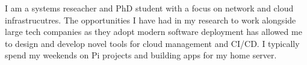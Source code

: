 \documentclass[9pt]{developercv} %
\begin{document}
\begin{minipage}[t]{0.35\textwidth} %
	\vspace{-\baselineskip} %

	I am a systems reseacher and PhD student with a focus on network and cloud
	infrastrucutres. The opportunities I have had in my research to work alongside large tech
	companies as they adopt modern software deployment has allowed me to design
	and develop novel tools for cloud management and CI/CD. I typically spend my
	weekends on Pi projects and building apps for my home server.\\
\end{minipage}
\hfill %
\begin{minipage}[t]{0.31\textwidth} %
	\vspace{-\baselineskip} %
	\begin{barchart}{4.1}
	\end{barchart}
\end{minipage}
\hfill %
\begin{minipage}[t]{0.29\textwidth} %
	\vspace{-\baselineskip}\vspace{-\baselineskip} %
	\\
	\mbox{}
	\mbox{}
	\mbox{}
	\mbox{}
	\mbox{}
\end{minipage}


\vspace{-1em}
\end{document}

